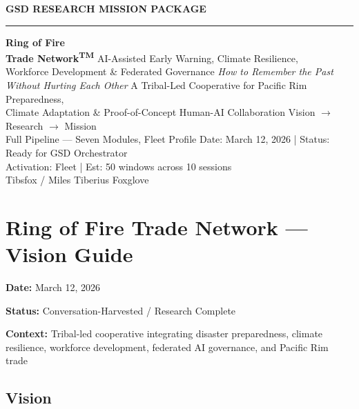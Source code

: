 \documentclass[11pt,letterpaper]{article}
\newcommand{\stageheader}[2]{%
  \noindent\colorbox{#2}{\makebox[\textwidth][l]{%
    \textcolor{white}{\bfseries\sffamily\hspace{6pt}#1\hspace{6pt}}}}%
  \vspace{0.5em}\par%
}
\newcommand{\metafield}[2]{\textbf{\sffamily #1} #2\par}
\begin{document}
\thispagestyle{empty}
\begin{center}
\vspace*{2cm}
{\small\sffamily\textcolor{primary}{\textbf{GSD RESEARCH MISSION PACKAGE}}}
\vspace{0.3cm}
\textcolor{bordergray}{\rule{8cm}{0.4pt}}
\vspace{1cm}
{\fontsize{28}{34}\selectfont\bfseries\sffamily\textcolor{primary}{Ring of Fire\\[0.3em]Trade Network\textsuperscript{TM}}}
\vspace{0.6cm}
{\Large\sffamily\textcolor{secondary}{AI-Assisted Early Warning, Climate Resilience,\\Workforce Development \& Federated Governance}}
\vspace{0.4cm}
{\large\sffamily\itshape\textcolor{tertiary}{How to Remember the Past Without Hurting Each Other}}
\vspace{0.3cm}
{\sffamily\textcolor{subtlegray}{A Tribal-Led Cooperative for Pacific Rim Preparedness,\\Climate Adaptation \& Proof-of-Concept Human-AI Collaboration}}
\vspace{2.5cm}
{\sffamily\textcolor{accent}{Vision $\rightarrow$ Research $\rightarrow$ Mission}}\\[0.3em]
{\small\sffamily\textcolor{accent}{Full Pipeline --- Seven Modules, Fleet Profile}}
\vspace{2cm}
{\small\sffamily\textcolor{subtlegray}{Date: March 12, 2026 | Status: Ready for GSD Orchestrator}}\\[0.3em]
{\small\sffamily\textcolor{subtlegray}{Activation: Fleet | Est: 50 windows across 10 sessions}}\\[0.3em]
{\small\sffamily\textcolor{subtlegray}{Tibsfox / Miles Tiberius Foxglove}}
\end{center}
\newpage
\tableofcontents
\newpage

\stageheader{STAGE 1 --- VISION DOCUMENT}{primary}

\section{Ring of Fire Trade Network --- Vision Guide}
\metafield{Date:}{March 12, 2026}
\metafield{Status:}{Conversation-Harvested / Research Complete}
\metafield{Context:}{Tribal-led cooperative integrating disaster preparedness, climate resilience, workforce development, federated AI governance, and Pacific Rim trade}

\subsection{Vision}
\end{document}
